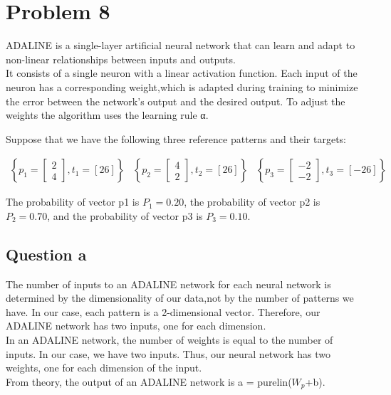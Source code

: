 
\section{Problem 8}
ADALINE is a single-layer artificial neural network that can learn and adapt to non-linear relationships between inputs and outputs. \\
It consists of a single neuron with a linear activation function. Each input of the neuron has a corresponding weight,which is adapted during training to minimize the error between the network's output and the desired output. To adjust the weights the algorithm uses the learning rule α.
\vspace{0.3cm}

Suppose that we have the following three reference patterns and their targets:
\vspace{5mm}

\[
\begin{array}{ccc}
	\left\{ 
	p_1 = \left[
	\begin{array}{c}
		2 \\
		4
	\end{array}
	\right], t_1 = \left[26\right]
	\right\} & 
	\left\{ 
	p_2 = \left[
	\begin{array}{c}
		4 \\
		2
	\end{array}
	\right], t_2 = \left[26\right]
	\right\}
	&\left\{ 
	p_3 = \left[
	\begin{array}{c}
		-2 \\
		-2
	\end{array}
	\right], t_3 = \left[-26\right]
	\right\}
	
\end{array}
\]

\vspace{5mm}

The probability of vector p1 is $P_{1}= 0.20$, the probability of vector p2 is $P_{2}= 0.70$, and the probability of vector p3 is $P_{3}= 0.10$.


\subsection{Question a}
The number of inputs to an ADALINE network for each neural network is determined by the dimensionality of our data,not by the number of patterns we have. In our case, each pattern is a 2-dimensional vector. Therefore, our ADALINE network has two inputs, one for each dimension.\\
In an ADALINE network, the number of weights is equal to the number of inputs. In our case, we have two inputs. Thus, our neural network has two weights, one for each dimension of the input.\\
From theory, the output of an ADALINE network is a = purelin($W_{p}$+b).\\


